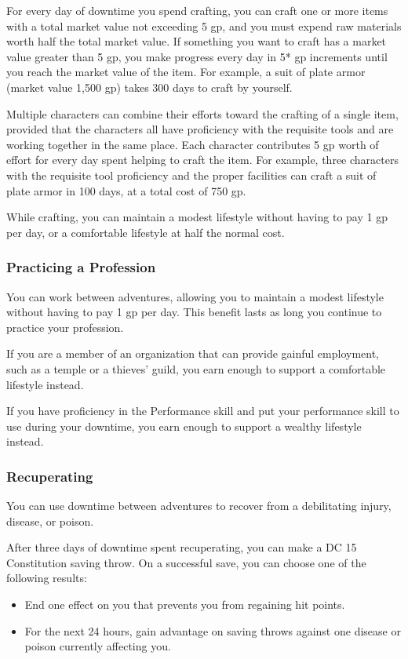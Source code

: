 For every day of downtime you spend crafting, you can craft one or more items with a total market value not exceeding 5 gp, and you must expend raw materials worth half the total market value. If something you want to craft has a market value greater than 5 gp, you make progress every day in 5* gp increments until you reach the market value of the item. For example, a suit of plate armor (market value 1,500 gp) takes 300 days to craft by yourself.

Multiple characters can combine their efforts toward the crafting of a single item, provided that the characters all have proficiency with the requisite tools and are working together in the same place. Each character contributes 5 gp worth of effort for every day spent helping to craft the item. For example, three characters with the requisite tool proficiency and the proper facilities can craft a suit of plate armor in 100 days, at a total cost of 750 gp.

While crafting, you can maintain a modest lifestyle without having to pay 1 gp per day, or a comfortable lifestyle at half the normal cost.

\subsubsection{Practicing a Profession}

You can work between adventures, allowing you to maintain a modest lifestyle without having to pay 1 gp per day. This benefit lasts as long you continue to practice your profession.

If you are a member of an organization that can provide gainful employment, such as a temple or a thieves' guild, you earn enough to support a comfortable lifestyle instead.

If you have proficiency in the Performance skill and put your performance skill to use during your downtime, you earn enough to support a wealthy lifestyle instead.

\subsubsection{Recuperating}

You can use downtime between adventures to recover from a debilitating injury, disease, or poison.

After three days of downtime spent recuperating, you can make a DC 15 Constitution saving throw. On a successful save, you can choose one of the following results:
\begin{itemize}
    \item End one effect on you that prevents you from regaining hit points.
    \item For the next 24 hours, gain advantage on saving throws against one disease or poison currently affecting you.
\end{itemize}
